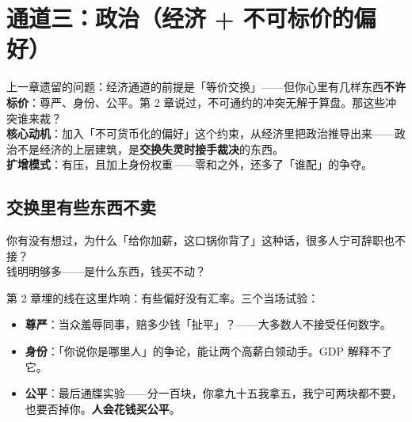 \documentclass[../../main2.tex]{subfiles}
\begin{document}
\chapter{通道三：政治（经济 + 不可标价的偏好）}
\label{ch:politics}

\begin{motivation}
	上一章遗留的问题：经济通道的前提是「等价交换」——但你心里有几样东西\textbf{不许标价}：尊严、身份、公平。第 2 章说过，不可通约的冲突无解于算盘。那这些冲突谁来裁？\\
	\textbf{核心动机}：加入「不可货币化的偏好」这个约束，从经济里把政治推导出来——政治不是经济的上层建筑，是\textbf{交换失灵时接手裁决}的东西。\\
	\textbf{扩增模式}：有压，且加上身份权重——零和之外，还多了「谁配」的争夺。
\end{motivation}

\begin{logicmap}
\end{logicmap}

\section{交换里有些东西不卖}

\begin{readingnote}
	你有没有想过，为什么「给你加薪，这口锅你背了」这种话，很多人宁可辞职也不接？\\
	钱明明够多——是什么东西，钱买不动？
\end{readingnote}

第 2 章埋的线在这里炸响：有些偏好没有汇率。三个当场试验：

\begin{itemize}
	\item \textbf{尊严}：当众羞辱同事，赔多少钱「扯平」？——大多数人不接受任何数字。
	\item \textbf{身份}：「你说你是哪里人」的争论，能让两个高薪白领动手。GDP 解释不了它。
	\item \textbf{公平}：最后通牒实验——分一百块，你拿九十五我拿五，我宁可两块都不要，也要否掉你。\textbf{人会花钱买公平}。
\end{itemize}
\end{document}

